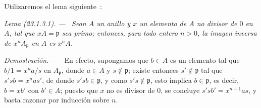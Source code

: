 \documentclass[10pt,oneside]{book}
\makeatletter
\newcommand{\setmanualcurrentlabel}[1]{\def\@currentlabel{#1}}
\newenvironment{lemma}[1][]{%
  \setmanualcurrentlabel{#1}\par\medskip\noindent\itshape Lema (#1). ---\ }{\par}
\newenvironment{proof}{%
  \par\medskip\noindent\textit{Demostración. ---\ }}{\par}
\makeatother
\begin{document}
Utilizaremos el lema siguiente~:

\begin{lemma}[23.1.3.1]
\label{0.23.1.3.1-es}
Sean $A$ un anillo y $x$ un elemento de $A$ no divisor de $0$ en $A$, tal
que $xA=\mathfrak p$ sea primo; entonces, para todo entero $n>0$, la imagen
inversa de $x^nA_{\mathfrak p}$ en $A$ es $x^nA$.
\end{lemma}

\begin{proof}
En efecto, supongamos que $b\in A$ es un elemento tal que
$b/1=x^na/s$ en $A_{\mathfrak p}$, donde $a\in A$ y
$s\notin\mathfrak p$; existe entonces $s'\notin\mathfrak p$ tal que
$s'sb=x^nas'$, de donde $s'sb\in\mathfrak p$, y como
$s's\notin\mathfrak p$, esto implica $b\in\mathfrak p$, es decir,
$b=xb'$ con $b'\in A$; puesto que $x$ no es divisor de $0$, se concluye
$s'sb'=x^{n-1}as$, y basta razonar por inducción sobre $n$.
\end{proof}
\end{document}
